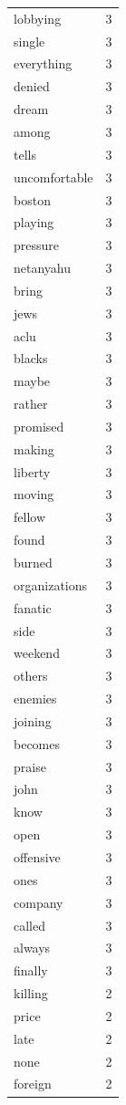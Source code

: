 \begin{tabular}{lr}
lobbying & 3 \\
single & 3 \\
everything & 3 \\
denied & 3 \\
dream & 3 \\
among & 3 \\
tells & 3 \\
uncomfortable & 3 \\
boston & 3 \\
playing & 3 \\
pressure & 3 \\
netanyahu & 3 \\
bring & 3 \\
jews & 3 \\
aclu & 3 \\
blacks & 3 \\
maybe & 3 \\
rather & 3 \\
promised & 3 \\
making & 3 \\
liberty & 3 \\
moving & 3 \\
fellow & 3 \\
found & 3 \\
burned & 3 \\
organizations & 3 \\
fanatic & 3 \\
side & 3 \\
weekend & 3 \\
others & 3 \\
enemies & 3 \\
joining & 3 \\
becomes & 3 \\
praise & 3 \\
john & 3 \\
know & 3 \\
open & 3 \\
offensive & 3 \\
ones & 3 \\
company & 3 \\
called & 3 \\
always & 3 \\
finally & 3 \\
killing & 2 \\
price & 2 \\
late & 2 \\
none & 2 \\
foreign & 2 \\

\end{tabular}
